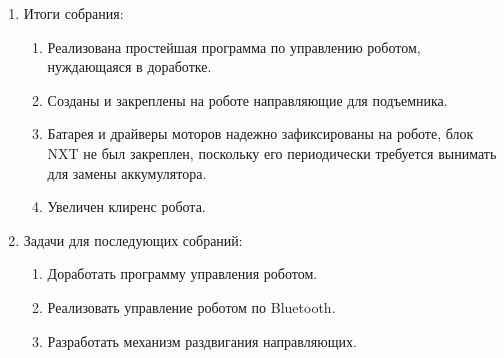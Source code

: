 \begin{enumerate}
\begin{enumerate}
    \end{enumerate}
    
	\item Итоги собрания: 
	\begin{enumerate}
	  \item  Реализована простейшая программа по управлению роботом, нуждающаяся в доработке.
	  
      \item  Созданы и закреплены на роботе направляющие для подъемника.
      
      \item  Батарея и драйверы моторов надежно зафиксированы на роботе, блок NXT не был закреплен, поскольку его периодически требуется вынимать для замены аккумулятора.
      
      \item  Увеличен клиренс робота.
      
    \end{enumerate}
    
	\item Задачи для последующих собраний:
	\begin{enumerate}
	  \item Доработать программу управления роботом.
	  
	  \item Реализовать управление роботом по Bluetooth.
	  
	  \item Разработать механизм раздвигания направляющих.

    \end{enumerate}     
\end{enumerate}
\fillpage
